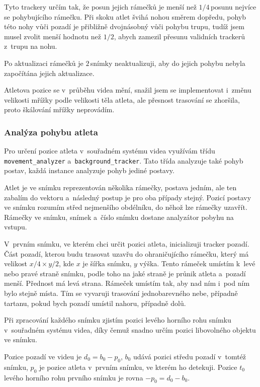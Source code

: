 Tyto trackery určím tak, že posun jejich rámečků je menší než $1/4$\,\rm posunu nejvíce se pohybujícího rámečku. Při skoku atlet švihá nohou směrem dopředu, pohyb této nohy vůči pozadí je přibližně dvojnásobný vůči pohybu trupu, tudíž jsem musel zvolit menší hodnotu než $1/2$, abych zamezil přesunu validních trackerů z~trupu na nohu.

Po aktualizaci rámečků je $2$\,\rm snímky neaktualizuji, aby do jejich pohybu nebyla započítána jejich aktualizace.

Atletova pozice se v~průběhu videa mění, snažil jsem se implementovat i~změnu velikosti mřížky podle velikosti těla atleta, ale přesnost trasování se zhoršila, proto škálování mřížky neprovádím.


\subsubsection{Analýza pohybu atleta}

Pro určení pozice atleta v~souřadném systému videa využívám třídu \texttt{movement\_analyzer} a~\texttt{background\_tracker}. Tato třída analyzuje také pohyb postav, každá instance analyzuje pohyb jediné postavy.

Atlet je ve snímku reprezentován několika rámečky, postava jedním, ale ten zabalím do vektoru a~následný postup je pro oba případy stejný. Pozicí postavy ve snímku rozumím střed nejmenšího obdélníku, do něhož lze rámečky uzavřít. Rámečky ve snímku, snímek a~číslo snímku dostane analyzátor pobyhu na vstupu.

V~prvním snímku, ve kterém chci určit pozici atleta, inicializuji tracker pozadí. Část pozadí, kterou budu trasovat uzavřu do ohraničujícího rámečku, který má velikost $x/4\times y/2$, kde $x$ je šířka snímku, $y$ výška. Tento rámeček umístím k~levé nebo pravé straně snímku, podle toho na jaké straně je průnik atleta a~pozadí menší. Přednost má levá strana. Rámeček umístím tak, aby nad ním i~pod ním bylo stejně místa. Tím se vyvaruji trasování jednobarevného nebe, případně tartanu, pokud bych pozadí umístil nahoru, případně dolů.

Při zpracování každého snímku zjistím pozici levého horního rohu snímku v~souřadném systému videa, díky čemuž snadno určím pozici libovolného objektu ve snímku.

Pozice pozadí ve videu je $d_0=b_0-p_0$, $b_0$ udává pozici středu pozadí v~tomtéž snímku, $p_0$ je pozice atleta v~prvním snímku, ve kterém ho detekuji. Pozice $t_0$ levého horního rohu prvního snímku je rovna $-p_0=d_0-b_0$.

